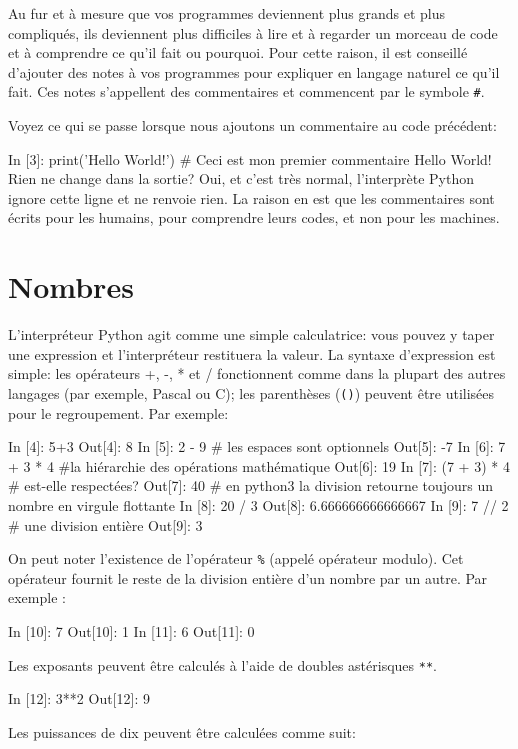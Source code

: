 \documentclass[%
oneside,                 %
final,                   %
10pt]{article}
\begin{document}
Au fur et à mesure que vos programmes deviennent plus grands et plus compliqués, ils deviennent plus difficiles à lire et à regarder un morceau de code et à comprendre ce qu'il fait ou pourquoi. Pour cette raison, il est conseillé d’ajouter des notes à vos programmes pour expliquer en langage naturel ce qu’il fait. Ces notes s'appellent des commentaires et commencent par le symbole \Verb!#!.

Voyez ce qui se passe lorsque nous ajoutons un commentaire au code précédent:

\bipy
In [3]: print('Hello World!') # Ceci est mon premier commentaire
Hello World!
\eipy
Rien ne change dans la sortie? Oui, et c’est très normal, l’interprète Python ignore cette ligne et ne renvoie rien. La raison en est que les commentaires sont écrits pour les humains, pour comprendre leurs codes, et non pour les machines.

\section{Nombres}

L'interpréteur Python agit comme une simple calculatrice: vous pouvez y taper une expression et l'interpréteur restituera la valeur. La syntaxe d'expression est simple: les opérateurs +, -, * et / fonctionnent comme dans la plupart des autres langages (par exemple, Pascal ou C); les parenthèses (\texttt{()}) peuvent être utilisées pour le regroupement. Par exemple:

\bipy
In [4]: 5+3
Out[4]: 8
In [5]: 2 - 9      # les espaces sont optionnels
Out[5]: -7
In [6]: 7 + 3 * 4  #la hiérarchie des opérations mathématique
Out[6]: 19
In [7]: (7 + 3) * 4  # est-elle respectées?
Out[7]: 40
# en python3 la division retourne toujours un nombre en virgule flottante
In [8]: 20 / 3
Out[8]: 6.666666666666667
In [9]: 7 // 2      # une division entière
Out[9]: 3
\eipy

On peut noter l’existence de l’opérateur \Verb!%! (appelé opérateur modulo). Cet opérateur fournit le reste de la division entière d’un nombre par un autre. Par exemple :

\bipy
In [10]: 7 %
Out[10]: 1
In [11]: 6 %
Out[11]: 0
\eipy

Les exposants peuvent être calculés à l'aide de doubles astérisques \texttt{**}.

\bipy
In [12]: 3**2
Out[12]: 9
\eipy

Les puissances de dix peuvent être calculées comme suit:
\end{document}

